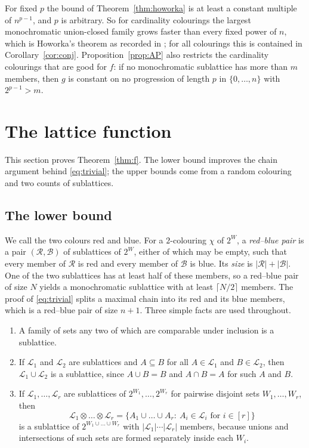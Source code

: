 \documentclass[11pt,reqno]{amsart}
\numberwithin{equation}{section}
\theoremstyle{plain}
\theoremstyle{definition}
\theoremstyle{remark}
\newcommand{\cL}{\mathcal{L}}
\newcommand{\cB}{\mathcal{B}}
\newcommand{\cR}{\mathcal{R}}
\begin{document}
For fixed $p$ the bound of Theorem~\ref{thm:howorka} is at least a
constant multiple of $n^{p-1}$, and $p$ is arbitrary. So for cardinality
colourings the largest monochromatic union-closed family grows faster
than every fixed power of $n$, which is Howorka's theorem as recorded in
\cite{Bl26}; for all colourings this is contained in
Corollary~\ref{cor:conj}. Proposition~\ref{prop:AP} also restricts the
cardinality colourings that are good for $f$: if no monochromatic
sublattice has more than $m$ members, then $g$ is constant on no
progression of length $p$ in $\{0,\dots,n\}$ with $2^{p-1}>m$.

\section{The lattice function}
\label{sec:f}

This section proves Theorem~\ref{thm:f}. The lower bound improves the
chain argument behind \eqref{eq:trivial}; the upper bounds come from a
random colouring and two counts of sublattices.

\subsection{The lower bound}

We call the two colours red and blue. For a $2$-colouring $\chi$ of
$2^{W}$, a \emph{red--blue pair} is a pair $(\cR,\cB)$ of sublattices of
$2^{W}$, either of which may be empty, such that every member of $\cR$ is
red and every member of $\cB$ is blue. Its \emph{size} is
$|\cR|+|\cB|$. One of the two sublattices has at least half of these
members, so a red--blue pair of size $N$ yields a monochromatic
sublattice with at least $\lceil N/2\rceil$ members. The proof of
\eqref{eq:trivial} splits a maximal chain into its red and its blue
members, which is a red--blue pair of size $n+1$. Three simple facts are
used throughout.

\begin{enumerate}[label=\textup{(L\arabic*)},leftmargin=2.6em]
\item A family of sets any two of which are comparable under inclusion
is a sublattice.
\item If $\cL_1$ and $\cL_2$ are sublattices and $A\subseteq B$ for all
$A\in\cL_1$ and $B\in\cL_2$, then $\cL_1\cup\cL_2$ is a sublattice, since
$A\cup B=B$ and $A\cap B=A$ for such $A$ and $B$.
\item If $\cL_1,\dots,\cL_r$ are sublattices of $2^{W_1},\dots,2^{W_r}$
for pairwise disjoint sets $W_1,\dots,W_r$, then
\[
\cL_1\otimes\dots\otimes\cL_r=\bigl\{A_1\cup\dots\cup A_r:\
A_i\in\cL_i\text{ for }i\in[r]\bigr\}
\]
is a sublattice of $2^{W_1\cup\dots\cup W_r}$ with
$|\cL_1|\cdots|\cL_r|$ members, because unions and intersections of such
sets are formed separately inside each $W_i$.
\end{enumerate}
\end{document}
